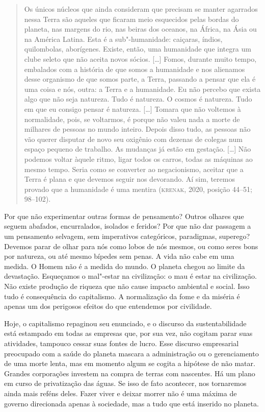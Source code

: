 \begin{quote}
Os únicos núcleos que ainda consideram que precisam se manter
agarrados nessa Terra são aqueles que ficaram meio esquecidos pelas
bordas do planeta, nas margens do rio, nas beiras dos oceanos, na
África, na Ásia ou na América Latina. Esta é a sub"-humanidade: caiçaras,
índios, quilombolas, aborígenes. Existe, então, uma humanidade que
integra um clube seleto que não aceita novos sócios. {[}\ldots{}{]} Fomos,
durante muito tempo, embalados com a história de que somos a humanidade
e nos alienamos desse organismo de que somos parte, a Terra, passando a
pensar que ela é uma coisa e nós, outra: a Terra e a humanidade. Eu não
percebo que exista algo que não seja natureza. Tudo é natureza. O cosmos
é natureza. Tudo em que eu consigo pensar é natureza. {[}\ldots{}{]} Tomara
que não voltemos à normalidade, pois, se voltarmos, é porque não valeu
nada a morte de milhares de pessoas no mundo inteiro. Depois disso tudo,
as pessoas não vão querer disputar de novo seu oxigênio com dezenas de
colegas num espaço pequeno de trabalho. As mudanças já estão em
gestação. {[}\ldots{}{]} Não podemos voltar àquele ritmo, ligar todos os
carros, todas as máquinas ao mesmo tempo. Seria como se converter ao
negacionismo, aceitar que a Terra é plana e que devemos seguir nos
devorando. Aí sim, teremos provado que a humanidade é uma mentira
(\textsc{krenak}, 2020, posição 44--51; 98--102).
\end{quote}

Por que não experimentar outras formas de pensamento? Outros olhares que
seguem abafados, encurralados, isolados e feridos? Por que não dar
passagem a um pensamento selvagem, sem imperativos categóricos,
paradigmas, superego? Devemos parar de olhar para nós como lobos de nós
mesmos, ou como seres bons por natureza, ou até mesmo bípedes sem penas.
A vida não cabe em uma medida. O Homem não é a medida do mundo. O
planeta chegou ao limite da devastação. Esqueçamos o mal"-estar na
civilização: o mau é estar na civilização. Não existe produção de
riqueza que não cause impacto ambiental e social. Isso tudo é
consequência do capitalismo. A normalização da fome e da miséria é
apenas um dos perigosos efeitos do que entendemos por civilidade.

Hoje, o capitalismo repaginou seu enunciado, e o discurso da
sustentabilidade está estampado em todas as empresas que, por sua vez,
não cogitam parar suas atividades, tampouco cessar suas fontes de lucro.
Esse discurso empresarial preocupado com a saúde do planeta mascara a
administração ou o gerenciamento de uma morte lenta, mas em momento
algum se cogita a hipótese de não matar. Grandes corporações investem na
compra de terras com nascentes. Há um plano em curso de privatização das
águas. Se isso de fato acontecer, nos tornaremos ainda mais reféns
deles. Fazer viver e deixar morrer não é uma máxima de governo
direcionada apenas à sociedade, mas a tudo que está inserido no planeta.


